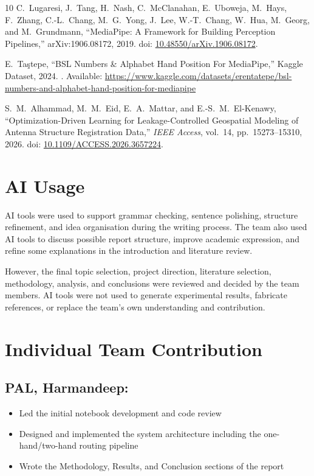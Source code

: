 \documentclass[conference]{IEEEtran}
\begin{document}
\begin{thebibliography}{10}
C.~Lugaresi, J.~Tang, H.~Nash, C.~McClanahan, E.~Uboweja, M.~Hays,
F.~Zhang, C.-L.~Chang, M.~G.~Yong, J.~Lee, W.-T.~Chang, W.~Hua,
M.~Georg, and M.~Grundmann,
``MediaPipe: A Framework for Building Perception Pipelines,''
arXiv:1906.08172, 2019.
\newblock doi: \href{https://doi.org/10.48550/arXiv.1906.08172}{10.48550/arXiv.1906.08172}.

E.~Ta\c{s}tepe,
``BSL Numbers \& Alphabet Hand Position For MediaPipe,''
Kaggle Dataset, 2024.
\newblock [Online]. Available: \url{https://www.kaggle.com/datasets/erentatepe/bsl-numbers-and-alphabet-hand-position-for-mediapipe}

S.~M.~Alhammad, M.~M.~Eid, E.~A.~Mattar, and E.-S.~M.~El-Kenawy,
``Optimization-Driven Learning for Leakage-Controlled Geospatial Modeling of Antenna Structure Registration Data,''
\textit{IEEE Access}, vol.~14, pp.~15273--15310, 2026.
\newblock doi: \href{https://doi.org/10.1109/ACCESS.2026.3657224}{10.1109/ACCESS.2026.3657224}.

\end{thebibliography}

\appendices
\raggedbottom

\section{AI Usage}
\label{app:ai}

AI tools were used to support grammar checking, sentence polishing, structure refinement, and idea organisation during the writing process. The team also used AI tools to discuss possible report structure, improve academic expression, and refine some explanations in the introduction and literature review.

However, the final topic selection, project direction, literature selection, methodology, analysis, and conclusions were reviewed and decided by the team members. AI tools were not used to generate experimental results, fabricate references, or replace the team's own understanding and contribution.

\section{Individual Team Contribution}
\label{app:contrib}

\subsection{PAL, Harmandeep:}
\begin{itemize}
  \item Led the initial notebook development and code review
  \item Designed and implemented the system architecture including the one-hand/two-hand routing pipeline
  \item Wrote the Methodology, Results, and Conclusion sections of the report
\end{itemize}
\end{document}
